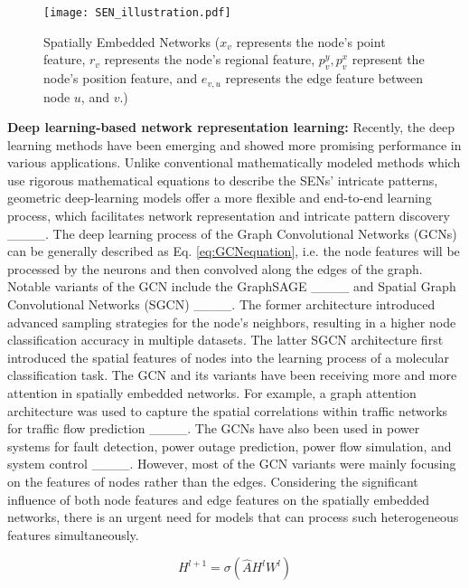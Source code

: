 \begin{figure*}[!htb]
  \centering
  \texttt{[image: SEN\_illustration.pdf]}
  \caption{Spatially Embedded Networks ($x_v$ represents the node's point
    feature, $r_v$ represents the node's regional feature, $p_v^y, p_v^x$
    represent the node's position feature, and $e_{v,u}$ represents the edge
    feature between node $u$, and $v$.)}
  \label{fig: spatially embedded networks}
\end{figure*}


\textbf{Deep learning-based network representation learning:} Recently, the deep
learning methods have been emerging and showed more promising performance in
various applications. Unlike conventional mathematically modeled methods which
use rigorous mathematical equations to describe the SENs' intricate patterns,
geometric deep-learning models offer a more flexible and end-to-end learning
process, which facilitates network representation and intricate pattern
discovery ____. The deep learning process of the Graph
Convolutional Networks (GCNs) can be generally described as
Eq. \ref{eq:GCNequation}, i.e. the node features will be processed by the
neurons and then convolved along the edges of the graph. Notable variants of the
GCN include the GraphSAGE ____ and Spatial Graph
Convolutional Networks (SGCN) ____. The former architecture
introduced advanced sampling strategies for the node's neighbors, resulting in a
higher node classification accuracy in multiple datasets. The latter SGCN
architecture first introduced the spatial features of nodes into the learning
process of a molecular classification task.  The GCN and its variants have been
receiving more and more attention in spatially embedded networks. For example, a
graph attention architecture was used to capture the spatial correlations within
traffic networks for traffic flow prediction ____. The GCNs have
also been used in power systems for fault detection, power outage prediction,
power flow simulation, and system control ____. However, most
of the GCN variants were mainly focusing on the features of nodes rather than
the edges. Considering the significant influence of both node features and edge
features on the spatially embedded networks, there is an urgent need for models
that can process such heterogeneous features simultaneously.

\begin{equation}
  \label{eq:GCNequation}
  H^{l+1} = \sigma(\hat{A}H^lW^l)
\end{equation}


